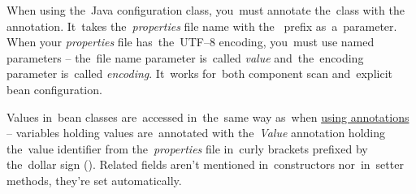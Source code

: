 When using the~Java configuration class, you~must annotate the~class with the~ annotation.
It~takes the~\textit{properties} file name with the~ prefix as~a~parameter.
When your \textit{properties} file has~the~UTF--8 encoding, you~must use named parameters -- the~file name parameter is~called \textit{value} and~the~encoding parameter is~called \textit{encoding}.
It~works for~both component scan and~explicit bean configuration.

Values in~bean classes are~accessed in~the~same way as~when \hyperref[readingpropertiesannotations]{using annotations} -- variables holding values are~annotated with the~\textit{Value} annotation holding the~value identifier from the~\textit{properties} file in~curly brackets prefixed by the~dollar sign ().
Related fields aren't mentioned in~constructors nor~in~setter methods, they're set automatically.

